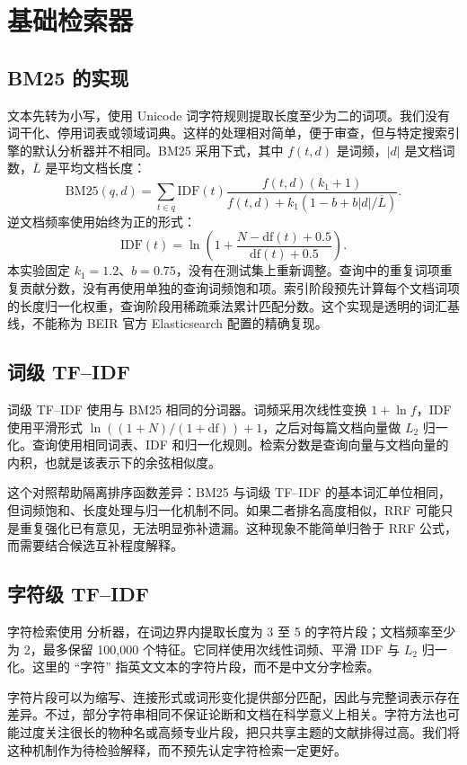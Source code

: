 \documentclass[sigconf,nonacm]{acmart}
\begin{document}
\section{基础检索器}
\subsection{BM25 的实现}
文本先转为小写，使用 Unicode 词字符规则提取长度至少为二的词项。我们没有词干化、停用词表或领域词典。这样的处理相对简单，便于审查，但与特定搜索引擎的默认分析器并不相同。BM25 采用下式，其中 $f(t,d)$ 是词频，$|d|$ 是文档词数，$\overline L$ 是平均文档长度：
\begin{equation}
\mathrm{BM25}(q,d)=\sum_{t\in q}\mathrm{IDF}(t)
\frac{f(t,d)(k_1+1)}{f(t,d)+k_1(1-b+b|d|/\overline L)}.
\end{equation}
逆文档频率使用始终为正的形式：
\begin{equation}
\mathrm{IDF}(t)=\ln\left(1+\frac{N-\mathrm{df}(t)+0.5}{\mathrm{df}(t)+0.5}\right).
\end{equation}
本实验固定 $k_1=1.2$、$b=0.75$，没有在测试集上重新调整。查询中的重复词项重复贡献分数，没有再使用单独的查询词频饱和项。索引阶段预先计算每个文档词项的长度归一化权重，查询阶段用稀疏乘法累计匹配分数。这个实现是透明的词汇基线，不能称为 BEIR 官方 Elasticsearch 配置的精确复现。

\subsection{词级 TF--IDF}
词级 TF--IDF 使用与 BM25 相同的分词器。词频采用次线性变换 $1+\ln f$，IDF 使用平滑形式 $\ln((1+N)/(1+\mathrm{df}))+1$，之后对每篇文档向量做 $L_2$ 归一化。查询使用相同词表、IDF 和归一化规则。检索分数是查询向量与文档向量的内积，也就是该表示下的余弦相似度。

这个对照帮助隔离排序函数差异：BM25 与词级 TF--IDF 的基本词汇单位相同，但词频饱和、长度处理与归一化机制不同。如果二者排名高度相似，RRF 可能只是重复强化已有意见，无法明显弥补遗漏。这种现象不能简单归咎于 RRF 公式，而需要结合候选互补程度解释。

\subsection{字符级 TF--IDF}
字符检索使用  分析器，在词边界内提取长度为 3 至 5 的字符片段；文档频率至少为 2，最多保留 100,000 个特征。它同样使用次线性词频、平滑 IDF 与 $L_2$ 归一化。这里的 ``字符'' 指英文文本的字符片段，而不是中文分字检索。

字符片段可以为缩写、连接形式或词形变化提供部分匹配，因此与完整词表示存在差异。不过，部分字符串相同不保证论断和文档在科学意义上相关。字符方法也可能过度关注很长的物种名或高频专业片段，把只共享主题的文献排得过高。我们将这种机制作为待检验解释，而不预先认定字符检索一定更好。
\end{document}

